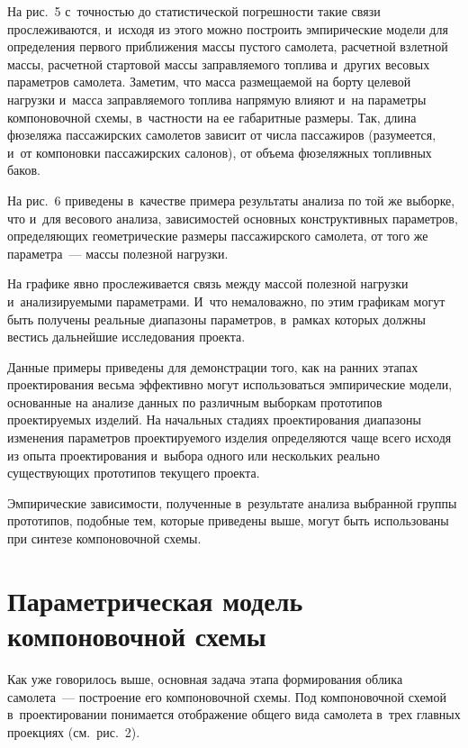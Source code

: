 \begin{multicols}{2}
  На рис.~5 с~точностью до статистической погрешности такие связи 
прослеживаются, и~исходя из этого мож\-но построить эмпирические модели для 
определения первого при\-бли\-же\-ния \mbox{массы} пус\-то\-го самолета, расчетной 
взлетной массы, расчетной стартовой массы за\-прав\-ля\-емо\-го топ\-ли\-ва и~других 
весовых па\-ра\-мет\-ров самолета. Заметим, что масса раз\-ме\-ща\-емой на борту 
целевой нагрузки и~масса за\-прав\-ля\-емо\-го топлива напрямую влияют и~на 
параметры компоновочной схемы, в~част\-ности на ее габаритные размеры. 
Так, длина фюзеляжа пассажирских самолетов зависит от чис\-ла 
пассажиров (разумеется, и~от компоновки пассажирских салонов), от объема 
фюзеляжных топ\-лив\-ных баков.
  


  На рис.~6 приведены в~качестве примера результаты анализа по той же 
вы\-бор\-ке, что и~для весового анализа, зависимостей основных конструктивных 
па\-ра\-мет\-ров, опре\-де\-ля\-ющих гео\-мет\-ри\-че\-ские размеры пассажирского самолета, 
от того же па\-ра\-мет\-ра~--- массы полезной нагрузки.
  



  На графике явно прослеживается связь между массой полезной нагрузки 
  и~ана\-ли\-зи\-ру\-емы\-ми па\-ра\-мет\-ра\-ми. И~что немаловажно, по этим графикам могут 
быть получены реальные диапазоны па\-ра\-мет\-ров, в~рамках которых должны 
вестись дальнейшие исследования проекта.
  
  Данные примеры приведены для демонстрации того, как на ранних этапах 
проектирования весьма эффективно могут использоваться эмпирические 
модели, основанные на анализе данных по различным выборкам прототипов 
про\-ек\-ти\-ру\-емых изделий. На начальных стадиях проектирования диапазоны 
изменения па\-ра\-мет\-ров про\-ек\-ти\-ру\-емо\-го изделия определяются чаще всего 
исходя из опыта проектирования и~выбора одного или нескольких реально 
су\-щест\-ву\-ющих прототипов текущего проекта.
  
  Эмпирические зависимости, полученные в~результате анализа выбранной 
группы прототипов, подобные тем, которые приведены выше, могут быть 
использованы при синтезе компоновочной схемы.

\section{Параметрическая модель компоновочной схемы}

    Как уже говорилось выше, основная задача этапа формирования облика 
самолета~--- построение его компоновочной схемы. Под компоновочной 
схемой в~проектировании понимается отоб\-ра\-же\-ние общего вида самолета 
в~трех главных проекциях (см.\ рис.~2).


\end{multicols}
